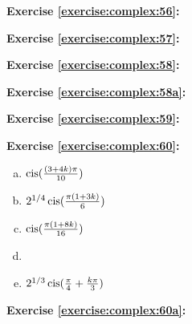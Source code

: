 \noindent\textbf{Exercise \ref{exercise:complex:56}:}

\noindent\textbf{Exercise \ref{exercise:complex:57}:}

\noindent\textbf{Exercise \ref{exercise:complex:58}:}

\noindent\textbf{Exercise \ref{exercise:complex:58a}:}

\noindent\textbf{Exercise \ref{exercise:complex:59}:}

\noindent\textbf{Exercise \ref{exercise:complex:60}:} %
\begin{enumerate}[(a)]
\item
	$\operatorname{cis}(\frac{(3+4k)\pi }{10})$
\item
$2^{1/4} \operatorname{cis} (\frac{\pi(1+3k)}{6})$
\item
	$\operatorname{cis}(\frac{\pi(1+8k)}{16})$
\item
\item
$2^{1/3} \operatorname{cis} ( \frac{\pi}{4} + \frac{k\pi}{3} )$

\end{enumerate}

\noindent\textbf{Exercise \ref{exercise:complex:60a}:} 

